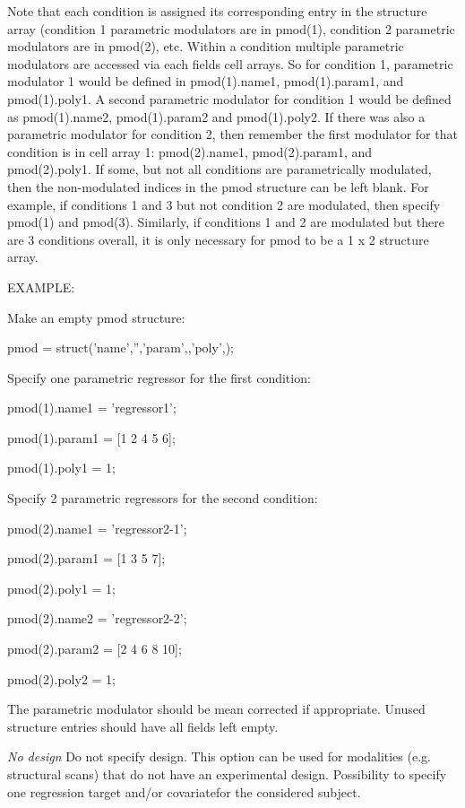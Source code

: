Note that each condition is assigned its corresponding entry in the structure array (condition 1 parametric modulators are in pmod(1), condition 2 parametric modulators are in pmod(2), etc. Within a condition multiple parametric modulators are accessed via each fields cell arrays. So for condition 1, parametric modulator 1 would be defined in  pmod(1).name{1}, pmod(1).param{1}, and pmod(1).poly{1}. A second parametric modulator for condition 1 would be defined as pmod(1).name{2}, pmod(1).param{2} and pmod(1).poly{2}. If there was also a parametric modulator for condition 2, then remember the first modulator for that condition is in cell array 1: pmod(2).name{1}, pmod(2).param{1}, and pmod(2).poly{1}. If some, but not all conditions are parametrically modulated, then the non-modulated indices in the pmod structure can be left blank. For example, if conditions 1 and 3 but not condition 2 are modulated, then specify pmod(1) and pmod(3). Similarly, if conditions 1 and 2 are modulated but there are 3 conditions overall, it is only necessary for pmod to be a 1 x 2 structure array.



EXAMPLE:

Make an empty pmod structure: 

  pmod = struct('name',{''},'param',{},'poly',{});

Specify one parametric regressor for the first condition: 

  pmod(1).name{1}  = 'regressor1';

  pmod(1).param{1} = [1 2 4 5 6];

  pmod(1).poly{1}  = 1;

Specify 2 parametric regressors for the second condition: 

  pmod(2).name{1}  = 'regressor2-1';

  pmod(2).param{1} = [1 3 5 7]; 

  pmod(2).poly{1}  = 1;

  pmod(2).name{2}  = 'regressor2-2';

  pmod(2).param{2} = [2 4 6 8 10];

  pmod(2).poly{2}  = 1;



The parametric modulator should be mean corrected if appropriate. Unused structure entries should have all fields left empty.


\textsl{No design}
Do not specify design. This option can be used for modalities (e.g. structural scans) that do not have an experimental design. Possibility to specify one regression target and/or covariatefor the considered subject.


